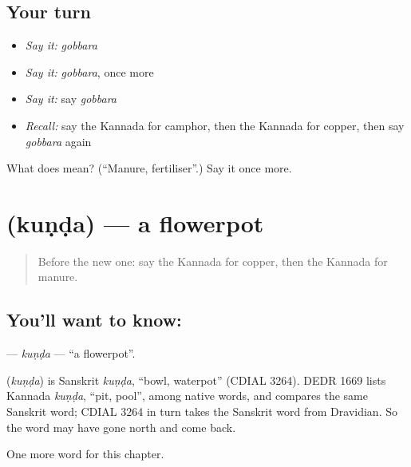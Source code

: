 \subsection*{Your turn}
\begin{itemize}
\raggedright
  \item \emph{Say it:} \emph{gobbara}
  \item \emph{Say it:} \emph{gobbara}, once more
  \item \emph{Say it:} say \emph{gobbara}
  \item \emph{Recall:} say the Kannada for camphor, then the Kannada for copper, then say \emph{gobbara} again
\end{itemize}

\begin{tcolorbox}[breakable,colback=teal!4,colframe=teal!35!black,title={Before you move on}]
What does  mean? (\textquotedblleft{}Manure, fertiliser\textquotedblright{}.) Say it once more.
\end{tcolorbox}
\section[\texorpdfstring{\kn{ಕುಂಡ} (kuṇḍa)}{ಕುಂಡ (kuṇḍa)}]{ (kuṇḍa) — a flowerpot}

\label{lesson:KA-C267-kunda}



\begin{quote}
Before the new one: say the Kannada for copper, then the Kannada for manure.
\end{quote}

\subsection*{You'll want to know: }
\textbf{} — \emph{kuṇḍa} — \textquotedblleft{}a flowerpot\textquotedblright{}.

\begin{cousinweb}
\textbf{} (\emph{kuṇḍa}) is Sanskrit \emph{kuṇḍa}, \textquotedblleft{}bowl, waterpot\textquotedblright{} (CDIAL 3264). DEDR 1669 lists Kannada \emph{kuṇḍa}, \textquotedblleft{}pit, pool\textquotedblright{}, among native words, and compares the same Sanskrit word; CDIAL 3264 in turn takes the Sanskrit word from Dravidian. So the word may have gone north and come back.
\end{cousinweb}

\begin{grammarlens}[title={What you've built}]
One more word for this chapter.
\end{grammarlens}

